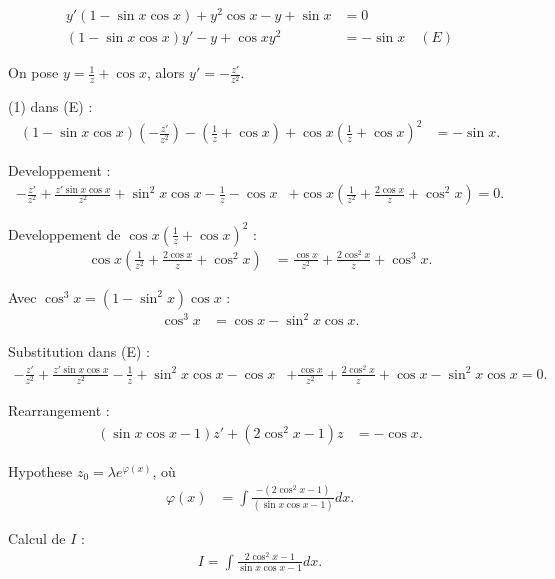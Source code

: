 \begin{align*}
    y' (1 - \sin x \cos x) + y^2 \cos x - y + \sin x &= 0 \\
    (1 - \sin x \cos x)y' - y + \cos x y^2 &= - \sin x \quad (E)
\end{align*}

On pose $y = \frac{1}{z} + \cos x$, alors $y' = - \frac{z'}{z^2}$.

(1) dans (E) :
\begin{align*}
    (1 - \sin x \cos x)\left(-\frac{z'}{z^2}\right) - \left(\frac{1}{z} + \cos x\right) + \cos x \left(\frac{1}{z} + \cos x\right)^2 &= - \sin x.
\end{align*}

Developpement :
\begin{align*}
    -\frac{z'}{z^2} + \frac{z' \sin x \cos x}{z^2} + \sin^2 x \cos x - \frac{1}{z} - \cos x &+ \cos x \left(\frac{1}{z^2} + \frac{2 \cos x}{z} + \cos^2 x \right) = 0.
\end{align*}

Developpement de $\cos x \left(\frac{1}{z} + \cos x \right)^2$ :
\begin{align*}
    \cos x \left( \frac{1}{z^2} + \frac{2 \cos x}{z} + \cos^2 x \right) &= \frac{\cos x}{z^2} + \frac{2 \cos^2 x}{z} + \cos^3 x.
\end{align*}

Avec $\cos^3 x = (1 - \sin^2 x) \cos x$ :
\begin{align*}
    \cos^3 x &= \cos x - \sin^2 x \cos x.
\end{align*}

Substitution dans (E) :
\begin{align*}
    - \frac{z'}{z^2} + \frac{z' \sin x \cos x}{z^2} - \frac{1}{z} + \sin^2 x \cos x - \cos x &+ \frac{\cos x}{z^2} + \frac{2 \cos^2 x}{z} + \cos x - \sin^2 x \cos x = 0.
\end{align*}

Rearrangement :
\begin{align*}
    (\sin x \cos x - 1) z' + (2 \cos^2 x - 1) z &= - \cos x.
\end{align*}

Hypothese $z_0 = \lambda e^{\varphi(x)}$, où
\begin{align*}
    \varphi(x) &= \int \frac{- (2 \cos^2 x - 1)}{(\sin x \cos x - 1)} dx.
\end{align*}

Calcul de $I$ :
\begin{align*}
    I = \int \frac{2 \cos^2 x - 1}{\sin x \cos x - 1} dx.
\end{align*}

